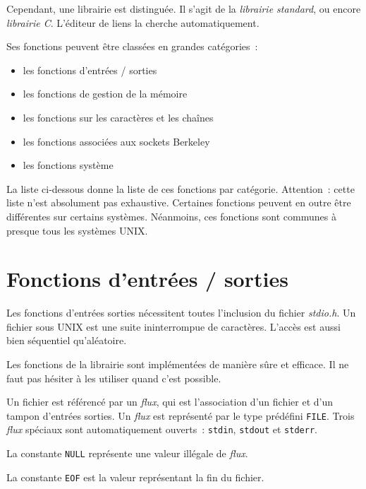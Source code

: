 \documentclass [twoside] {report}
\begin{document}
Cependant, une librairie est distinguée. Il s'agit de la
\emph {librairie standard}, ou encore \emph {librairie C}. L'éditeur
de liens la cherche automatiquement.

Ses fonctions peuvent être classées en grandes catégories~:

\begin {itemize}
    \item les fonctions d'entrées / sorties
    \item les fonctions de gestion de la mémoire
    \item les fonctions sur les caractères et les chaînes
    \item les fonctions associées aux sockets Berkeley
    \item les fonctions système
\end {itemize}

La liste ci-dessous donne la liste de ces fonctions par
catégorie. Attention~: cette liste n'est absolument pas
exhaustive. Certaines fonctions peuvent en outre être
différentes sur certains systèmes. Néanmoins, ces fonctions
sont communes à presque tous les systèmes UNIX.



\section {Fonctions d'entrées / sorties}


Les fonctions d'entrées sorties nécessitent toutes
l'inclusion du fichier \emph {stdio.h}. Un fichier sous UNIX est
une suite ininterrompue de caractères. L'accès est aussi
bien séquentiel qu'aléatoire.

Les fonctions de la librairie sont implémentées de manière
sûre et efficace. Il ne faut pas hésiter à les utiliser
quand c'est possible.

Un fichier est référencé par un \emph {flux}, qui est
l'association d'un fichier et d'un tampon d'entrées sorties.
Un \emph {flux} est représenté par le type prédéfini \texttt {FILE}. Trois
\emph {flux} spéciaux sont automatiquement ouverts~: \texttt {stdin},
\texttt {stdout} et \texttt {stderr}.

La constante \texttt {NULL} représente une valeur illégale de
\emph {flux}.

La constante \texttt {EOF} est la valeur représentant la fin du
fichier.
\end{document}
